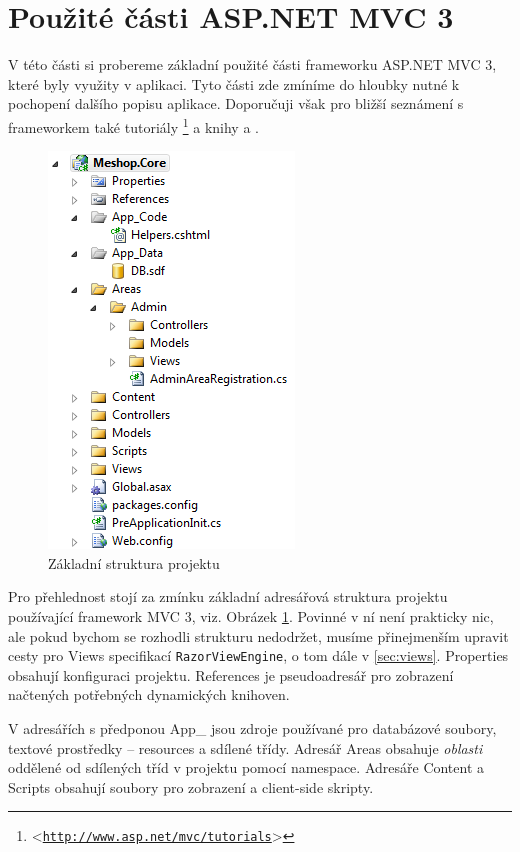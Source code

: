 \documentclass[11pt,twoside,a4paper]{book}
\let\oldUrl\url
\renewcommand\url[1]{<\texttt{\oldUrl{#1}}>}
\begin{document}
\section{Použité části ASP.NET MVC 3}

V této části si probereme základní použité části frameworku ASP.NET MVC 3, které byly využity v aplikaci. Tyto části zde zmíníme do hloubky nutné k pochopení dalšího popisu aplikace. Doporučuji však pro bližší seznámení s frameworkem také tutoriály \footnote{\url{http://www.asp.net/mvc/tutorials}} a knihy \cite{MVC1} a \cite{MVC2}. 

\begin{figure}[h!]
\begin{center}
\includegraphics[scale=0.99]{figures/struktura}
\caption{Základní struktura projektu}
\label{fig:struktura}
\end{center}
\end{figure}

Pro přehlednost stojí za zmínku základní adresářová struktura projektu používající framework MVC 3, viz. Obrázek \ref{fig:struktura}. Povinné v ní není prakticky nic, ale pokud bychom se rozhodli strukturu nedodržet, musíme přinejmenším upravit cesty pro \textsf{Views} specifikací \texttt{RazorViewEngine}, o tom dále v \ref{sec:views}. \textsf{Properties} obsahují konfiguraci projektu. \textsf{References} je pseudoadresář pro zobrazení načtených potřebných dynamických knihoven. 

V adresářích s předponou \textsf{App\_} jsou zdroje používané pro databázové soubory, textové prostředky -- \textsf{resources} a sdílené třídy. Adresář \textsf{Areas} obsahuje \textit{oblasti} oddělené od sdílených tříd v projektu pomocí \textsf{namespace}. Adresáře \textsf{Content} a \textsf{Scripts} obsahují soubory pro zobrazení a client-side skripty. 
\end{document}

